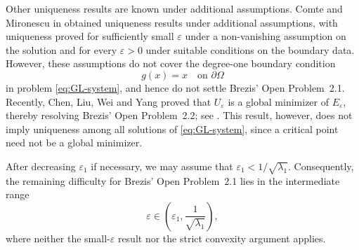 \documentclass[11pt]{amsart}
\theoremstyle{definition}
\theoremstyle{plain}
\numberwithin{equation}{section}
\begin{document}
Other uniqueness results are known under additional assumptions. Comte and Mironescu in \cite{ComteMironescu1999} obtained uniqueness results under additional assumptions, with uniqueness proved for sufficiently small $\varepsilon$ under a non-vanishing assumption on the solution and for every $\varepsilon>0$ under suitable conditions on the boundary data. However, these assumptions do not cover the degree-one boundary condition
\[
g(x)=x\quad\text{on }\partial\Omega
\]
in problem \eqref{eq:GL-system}, and hence do not settle Brezis' Open Problem~2.1. Recently, Chen, Liu, Wei and Yang proved that $U_\varepsilon$ is a global minimizer of $E_\varepsilon$, thereby resolving Brezis' Open Problem~2.2; see \cite{ChenLiuWeiYang2026}. This result, however, does not imply uniqueness among all solutions of \eqref{eq:GL-system}, since a critical point need not be a global minimizer.




After decreasing $\varepsilon_1$ if necessary, we may assume that $\varepsilon_1<1/\sqrt{\lambda_1}$. Consequently, the remaining difficulty for Brezis' Open Problem~2.1 lies in the intermediate range
\[
\varepsilon\in\left(\varepsilon_1,\frac{1}{\sqrt{\lambda_1}}\right),
\]
where neither the small-$\varepsilon$ result nor the strict convexity argument applies.
\end{document}
